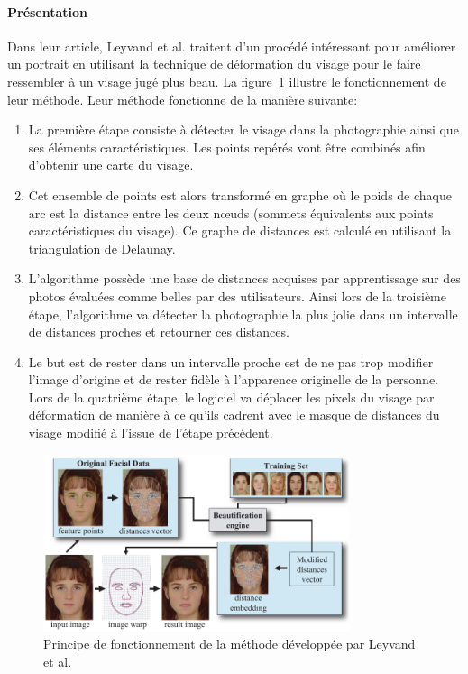 \documentclass[11pt, french,screen]{report-rd-info}
\begin{document}
\paragraph{Présentation}
Dans leur article, Leyvand et al. \cite{Leyvand2008} traitent d'un procédé intéressant pour améliorer un portrait en utilisant la technique de déformation du visage pour le faire ressembler à un visage jugé plus beau. La figure~\ref{fig:FonctionnemenLeyvand} illustre le fonctionnement de leur méthode. Leur méthode fonctionne de la manière suivante:
\begin{enumerate}
\item La première étape consiste à détecter le visage dans la photographie ainsi que ses éléments caractéristiques. Les points repérés vont être combinés afin d’obtenir une carte du visage.
\item Cet ensemble de points est alors transformé en graphe où le poids de chaque arc est la distance entre les deux nœuds (sommets équivalents aux points caractéristiques du visage). Ce graphe de distances est calculé en utilisant la triangulation de Delaunay.
\item L'algorithme possède une base de distances acquises par apprentissage sur des photos évaluées comme belles par des utilisateurs. Ainsi lors de la troisième étape, l'algorithme va détecter la photographie la plus jolie dans un intervalle de distances proches et retourner ces distances.
\item Le but est de rester dans un intervalle proche est de ne pas trop modifier l'image d'origine et de rester fidèle à l'apparence originelle de la personne.
Lors de la quatrième étape, le logiciel va déplacer les pixels du visage par déformation de manière à ce qu'ils cadrent avec le masque de distances du visage modifié à l’issue de l'étape précédent.
\end{enumerate}
\begin{figure}
	\centering
\includegraphics[width=0.8\textwidth]{Images/ea_algo_datadriven}
	\caption{Principe de fonctionnement de la méthode développée par Leyvand et al. \cite{Leyvand2008}}
	\label{fig:FonctionnemenLeyvand}
\end{figure}
\end{document}
